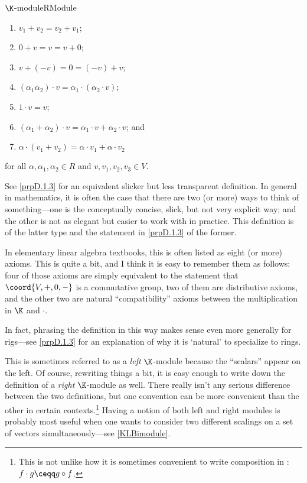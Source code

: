 \begin{dfn}{$\K$-module}{RModule}
\begin{rmk}
\begin{enumerate}
			\item $v_1+v_2=v_2+v_1$;
			\item $0+v=v=v+0$;
			\item $v+(-v)=0=(-v)+v$;
			\item $(\alpha _1\alpha _2)\cdot v=\alpha _1\cdot (\alpha _2\cdot v)$;
			\item $1\cdot v=v$;
			\item $(\alpha _1+\alpha _2)\cdot v=\alpha _1\cdot v+\alpha _2\cdot v$; and
			\item $\alpha \cdot (v_1+v_2)=\alpha \cdot v_1+\alpha \cdot v_2$
		\end{enumerate}
		for all $\alpha ,\alpha _1,\alpha _2\in R$ and $v,v_1,v_2,v_3\in V$.
	\end{rmk}
	\begin{rmk}
		See \cref{prpD.1.3} for an equivalent slicker but less transparent definition.  In general in mathematics, it is often the case that there are two (or more) ways to think of something---one is the conceptually concise, slick, but not very explicit way; and the other is not as elegant but easier to work with in practice.  This definition is of the latter type and the statement in \cref{prpD.1.3} of the former.
	\end{rmk}
	\begin{rmk}
		In elementary linear algebra textbooks, this is often listed as eight (or more) axioms.  This is quite a bit, and I think it is easy to remember them as follows:  four of those axioms are simply equivalent to the statement that $\coord{V,+,0,-}$ is a commutative group, two of them are distributive axioms, and the other two are natural ``compatibility'' axioms between the multiplication in $\K$ and $\cdot$.
	\end{rmk}
	\begin{rmk}
		In fact, phrasing the definition in this way makes sense even more generally for rigs---see \cref{prpD.1.3} for an explanation of why it is `natural' to specialize to rings.
	\end{rmk}
	\begin{rmk}
		This is sometimes referred to as a \emph{left} $\K$-module because the ``scalars'' appear on the left.  Of course, rewriting things a bit, it is easy enough to write down the definition of a \emph{right} $\K$-module as well.  There really isn't any serious difference between the two definitions, but one convention can be more convenient than the other in certain contexts.\footnote{This is not unlike how it is sometimes convenient to write composition in :  $f\cdot g\ceqq g\circ f$.}  Having a notion of both left and right modules is probably most useful when one wants to consider two different scalings on a set of vectors simultaneously---see \cref{KLBimodule}.

\end{rmk}
\end{dfn}
